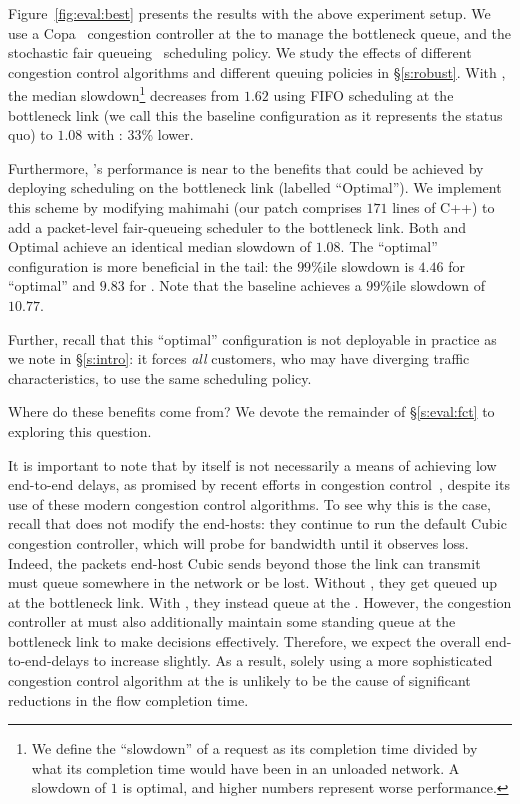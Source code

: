 Figure~\ref{fig:eval:best} presents the results with the above experiment setup.
We use a Copa~\cite{copa} congestion controller at the \inbox to manage the bottleneck queue, and the stochastic fair queueing~\cite{sfq} scheduling policy. 
We study the effects of different congestion control algorithms and different queuing policies in \S\ref{s:robust}.
With \name, the median 
slowdown\footnote{We define the ``slowdown'' of a request as its completion time divided by what its completion time would have been in an unloaded network. A slowdown of $1$ is optimal, and higher numbers represent worse performance.} 
decreases from $1.62$ using FIFO scheduling at the bottleneck link (we call this the baseline configuration as it represents the status quo) to $1.08$ with \name: 33\% lower.

Furthermore, \name's performance is near to the benefits that could be achieved by deploying scheduling on the bottleneck link (labelled ``Optimal''). 
We implement this scheme by modifying mahimahi (our patch comprises $171$ lines of C++) to add a packet-level fair-queueing scheduler to the bottleneck link.
Both \name and Optimal achieve an identical median slowdown of $1.08$.
The ``optimal'' configuration is more beneficial in the tail: the $99\%$ile slowdown is $4.46$ for ``optimal'' and $9.83$ for \name. Note that the baseline achieves a $99\%$ile slowdown of $10.77$.

Further, recall that this ``optimal'' configuration is not deployable in practice as we note in \S\ref{s:intro}: it forces \emph{all} customers, who may have diverging traffic characteristics, to use the same scheduling policy.

\vspace{10pt}
\noindent Where do these benefits come from? We devote the remainder of \S\ref{s:eval:fct}  to exploring this question.

 It is important to note that \name by itself is not necessarily a means of achieving low end-to-end delays, as promised by recent efforts in congestion control~\cite{copa, nimbus}, despite its use of these modern congestion control algorithms. 
To see why this is the case, recall that \name does not modify the end-hosts: they continue to run the default Cubic congestion controller, which will probe for bandwidth until it observes loss.
Indeed, the packets end-host Cubic sends beyond those the link can transmit must queue somewhere in the network or be lost. Without \name, they get queued up at the bottleneck link.
With \name, they instead queue at the \inbox.
However, the congestion controller at \inbox must also additionally maintain some standing queue at the bottleneck link to make decisions effectively.
Therefore, we expect the overall end-to-end-delays to increase slightly.
As a result, solely using a more sophisticated congestion control algorithm at the \name is unlikely to be the cause of significant reductions in the flow completion time.

